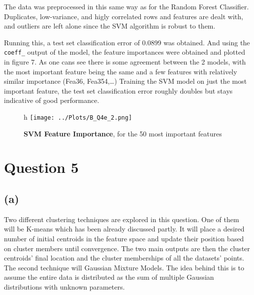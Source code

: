 \documentclass[12pt]{report} %
\begin{document}
The data was preprocessed in this same way as for the Random Forest Classifier. Duplicates, low-variance, and higly correlated rows and features are dealt with, and outliers are left alone since the SVM algorithm is robust to them.  

Running this, a test set classification error of 0.0899 was obtained. And using the \texttt{coeff\_} output of the model, the feature importances were obtained and plotted in figure 7. As one cans see there is some agreement between the 2 models, with the most important feature being the same and a few features with relatively similar importance (Fea36, Fea354,\ldots)  
Training the SVM model on just the most important feature, the test set classification error roughly doubles but stays indicative of good performance.

\begin{figure}{h}
    \centering
    \texttt{[image: ../Plots/B\_Q4e\_2.png]}
    \caption{\textbf{SVM Feature Importance}, for the 50 most important features}
\end{figure}

\newpage

\section*{Question 5}

\subsection*{(a)}

Two different clustering techniques are explored in this question. One of them will be K-means which has been already discussed partly. It will place a desired number of initial centroids in the feature space and update their position based on cluster members until convergence. The two main outputs are then the cluster centroids' final location and the cluster memberships of all the datasets' points.  
The second technique will Gaussian Mixture Models. The idea behind this is to assume the entire data is distributed as the sum of multiple Gaussian distributions with unknown parameters\cite[p. 260]{sklearn_book}. 






\end{document}

